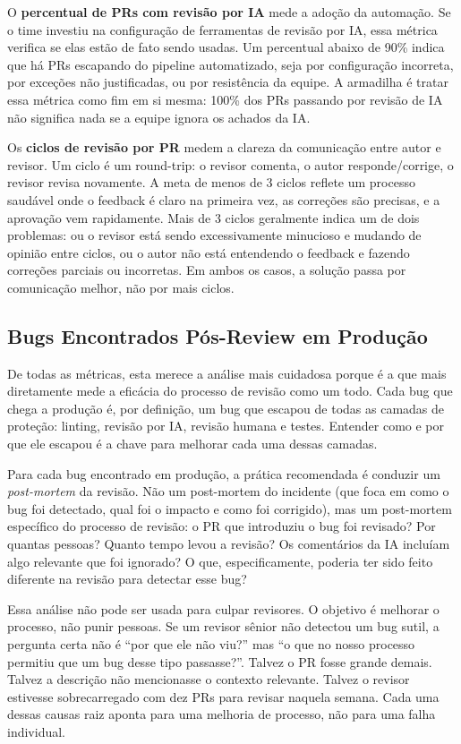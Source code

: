 O \textbf{percentual de PRs com revisão por IA} mede a adoção da automação. Se o
time investiu na configuração de ferramentas de revisão por IA, essa métrica verifica
se elas estão de fato sendo usadas. Um percentual abaixo de 90\% indica que há PRs
escapando do pipeline automatizado, seja por configuração incorreta, por exceções
não justificadas, ou por resistência da equipe. A armadilha é tratar essa métrica
como fim em si mesma: 100\% dos PRs passando por revisão de IA não significa nada se
a equipe ignora os achados da IA.

Os \textbf{ciclos de revisão por PR} medem a clareza da comunicação entre autor e
revisor. Um ciclo é um round-trip: o revisor comenta, o autor responde/corrige, o
revisor revisa novamente. A meta de menos de 3 ciclos reflete um processo saudável
onde o feedback é claro na primeira vez, as correções são precisas, e a aprovação
vem rapidamente. Mais de 3 ciclos geralmente indica um de dois problemas: ou o
revisor está sendo excessivamente minucioso e mudando de opinião entre ciclos, ou
o autor não está entendendo o feedback e fazendo correções parciais ou incorretas.
Em ambos os casos, a solução passa por comunicação melhor, não por mais ciclos.

\subsection{Bugs Encontrados Pós-Review em Produção}

De todas as métricas, esta merece a análise mais cuidadosa porque é a que mais
diretamente mede a eficácia do processo de revisão como um todo. Cada bug que chega
a produção é, por definição, um bug que escapou de todas as camadas de proteção:
linting, revisão por IA, revisão humana e testes. Entender como e por que ele
escapou é a chave para melhorar cada uma dessas camadas.

Para cada bug encontrado em produção, a prática recomendada é conduzir um
\textit{post-mortem} da revisão. Não um post-mortem do incidente (que foca em como
o bug foi detectado, qual foi o impacto e como foi corrigido), mas um post-mortem
específico do processo de revisão: o PR que introduziu o bug foi revisado? Por
quantas pessoas? Quanto tempo levou a revisão? Os comentários da IA incluíam algo
relevante que foi ignorado? O que, especificamente, poderia ter sido feito
diferente na revisão para detectar esse bug?

Essa análise não pode ser usada para culpar revisores. O objetivo é
melhorar o processo, não punir pessoas. Se um revisor sênior não detectou um bug
sutil, a pergunta certa não é ``por que ele não viu?'' mas ``o que no nosso processo
permitiu que um bug desse tipo passasse?''. Talvez o PR fosse grande demais. Talvez
a descrição não mencionasse o contexto relevante. Talvez o revisor estivesse
sobrecarregado com dez PRs para revisar naquela semana. Cada uma dessas causas raiz
aponta para uma melhoria de processo, não para uma falha individual.

